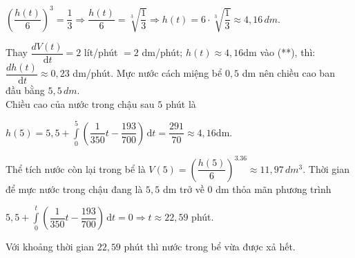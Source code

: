 \begin{ex}
{\begin{itemchoice}
        \centerline{
        $\left(\dfrac{h(t)}{6}\right)^3=\dfrac{1}{3}\Rightarrow \dfrac{h(t)}{6}=\sqrt[3]{\dfrac{1}{3}}\Rightarrow h(t)=6\cdot \sqrt[3]{\dfrac{1}{3}}\approx 4{,}16\,dm$.
        }
        Thay $\dfrac{dV(t)}{\mathrm{\,d}t}=2$ lít/phút $=2$ dm/phút; $h(t)\approx 4{,}16$dm vào (**), thì:$\dfrac{dh(t)}{\mathrm{\,d}t}\approx 0{,}23$ dm/phút.
        \itemch Mực nước cách miệng bể $0{,}5$ dm nên chiều cao ban đầu bằng $5{,}5\,dm$.\\
        Chiều cao của nước trong chậu sau $5$ phút là\\
        \centerline{$h(5)=5{,}5+\int\limits_0^5{\left(\dfrac{1}{350}t-\dfrac{193}{700}\right)\mathrm{\,d}t}=\dfrac{291}{70}\approx 4{,}16$dm.}
        Thể tích nước còn lại trong bể là $V(5)=\left(\dfrac{h(5)}{6}\right)^3.36\approx 11{,}97\,dm^3$.
        \itemch Thời gian để mực nước trong chậu đang là $5{,}5$ dm trở về $0$ dm thỏa mãn phương trình\\
        \centerline{$5{,}5+\displaystyle\int\limits_0^t{\left(\dfrac{1}{350}t-\dfrac{193}{700}\right)\mathrm{\,d}t}=0\Rightarrow t\approx 22{,}59$ phút.}
        Với khoảng thời gian $22{,}59$ phút thì nước trong bể vừa được xả hết.
    \end{itemchoice}
}
\end{ex}

